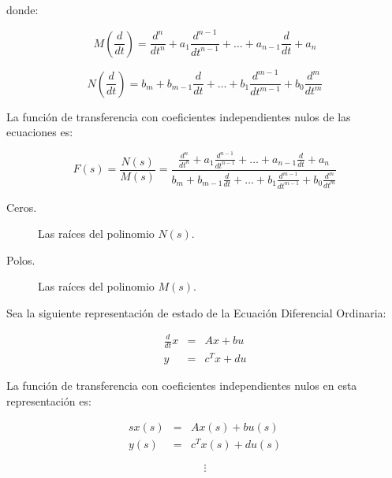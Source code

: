         donde:

        \begin{equation*}
            M \left( \frac{d}{dt} \right) = \frac{d^n}{dt^n} + a_1 \frac{d^{n-1}}{dt^{n-1}} + \dots + a_{n-1} \frac{d}{dt} + a_n
        \end{equation*}

        \begin{equation*}
            N \left( \frac{d}{dt} \right) = b_m + b_{m-1} \frac{d}{dt} + \dots + b_1 \frac{d^{m-1}}{dt^{m-1}} + b_0 \frac{d^m}{dt^m}
        \end{equation*}

        La función de transferencia con coeficientes independientes nulos de las ecuaciones es:

        \begin{equation}
            F(s) = \frac{N(s)}{M(s)} = \frac{\frac{d^n}{dt^n} + a_1 \frac{d^{n-1}}{dt^{n-1}} + \dots + a_{n-1} \frac{d}{dt} + a_n}{b_m + b_{m-1} \frac{d}{dt} + \dots + b_1 \frac{d^{m-1}}{dt^{m-1}} + b_0 \frac{d^m}{dt^m}}
        \end{equation}

        \begin{description}
            \item [Ceros.] Las raíces del polinomio $N(s)$.
            \item [Polos.] Las raíces del polinomio $M(s)$.
        \end{description}

        Sea la siguiente representación de estado de la Ecuación Diferencial Ordinaria:

        \begin{eqnarray}
        \frac{d}{dt} x & = & A x + b u \nonumber \\
        y & = & c^T x + d u \nonumber
        \end{eqnarray}

        La función de transferencia con coeficientes independientes nulos en esta representación es:

        \begin{eqnarray}
        s x(s) & = & A x(s) + b u(s) \nonumber \\
        y(s) & = & c^T x(s) + d u(s) \nonumber
        \end{eqnarray}

        \begin{equation}
            \vdots \nonumber
        \end{equation}

